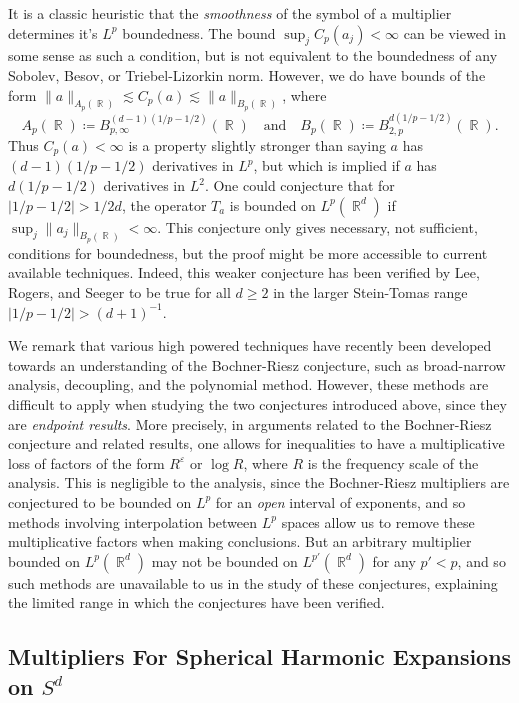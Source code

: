 \documentclass[11pt]{article}
\DeclareMathOperator{\RR}{\mathbb{R}}
\begin{document}
It is a classic heuristic that the \emph{smoothness} of the symbol of a multiplier determines it's $L^p$ boundedness. The bound $\sup_j C_p(a_j) < \infty$ can be viewed in some sense as such a condition, but is not equivalent to the boundedness of any Sobolev, Besov, or Triebel-Lizorkin norm. However, we do have bounds of the form $\| a \|_{A_p(\RR)} \lesssim C_p(a) \lesssim \| a \|_{B_p(\RR)}$, where
%
\[ A_p(\RR) \coloneqq B_{p,\infty}^{(d-1)(1/p - 1/2)}(\RR)\quad \text{and}\quad B_p(\RR) \coloneqq B_{2,p}^{d(1/p - 1/2)}(\RR). \]
%
Thus $C_p(a) < \infty$ is a property slightly stronger than saying $a$ has $(d-1)(1/p - 1/2)$ derivatives in $L^p$, but which is implied if $a$ has $d(1/p - 1/2)$ derivatives in $L^2$. One could conjecture that for $|1/p - 1/2| > 1/2d$, the operator $T_a$ is bounded on $L^p(\RR^d)$ if $\sup_j \| a_j \|_{B_p(\RR)} < \infty$. This conjecture only gives necessary, not sufficient, conditions for boundedness, but the proof might be more accessible to current available techniques. Indeed, this weaker conjecture has been verified by Lee, Rogers, and Seeger \cite{LeeRogersSeeger} to be true for all $d \geq 2$ in the larger Stein-Tomas range $|1/p - 1/2| > (d+1)^{-1}$.

We remark that various high powered techniques have recently been developed towards an understanding of the Bochner-Riesz conjecture, such as broad-narrow analysis, decoupling, and the polynomial method. However, these methods are difficult to apply when studying the two conjectures introduced above, since they are \emph{endpoint results}. More precisely, in arguments related to the Bochner-Riesz conjecture and related results, one allows for inequalities to have a multiplicative loss of factors of the form $R^\varepsilon$ or $\log R$, where $R$ is the frequency scale of the analysis. This is negligible to the analysis, since the Bochner-Riesz multipliers are conjectured to be bounded on $L^p$ for an \emph{open} interval of exponents, and so methods involving interpolation between $L^p$ spaces allow us to remove these multiplicative factors when making conclusions. But an arbitrary multiplier bounded on $L^p(\RR^d)$ may not be bounded on $L^{p'}(\RR^d)$ for any $p' < p$, and so such methods are unavailable to us in the study of these conjectures, explaining the limited range in which the conjectures have been verified.

\subsection{Multipliers For Spherical Harmonic Expansions on $S^d$}
\end{document}

